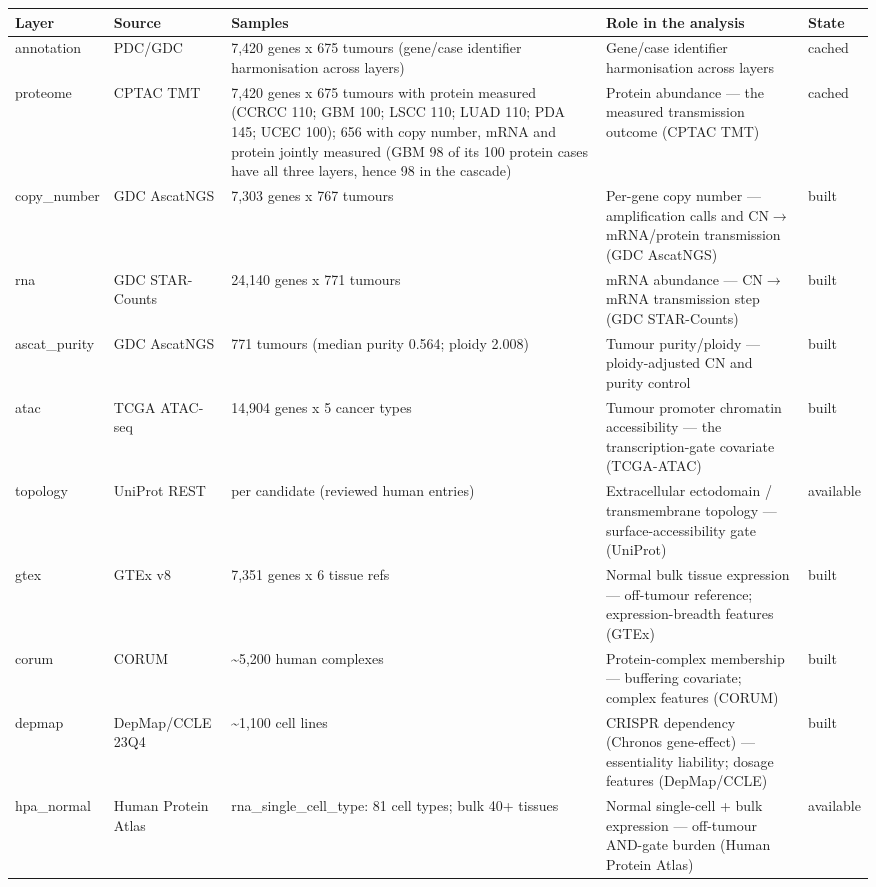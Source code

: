 \documentclass[times, twoside]{zHenriquesLab-StyleBioRxiv}
\begin{document}
\begin{table}[tbp]
\centering
{\scriptsize
\begin{tabular}{@{}p{}p{}p{}p{}p{}@{}}
\toprule
\textbf{Layer} & \textbf{Source} & \textbf{Samples} & \textbf{Role in the analysis} & \textbf{State} \\
\midrule
annotation & PDC/GDC & 7,420 genes x 675 tumours (gene/case identifier harmonisation across layers) & Gene/case identifier harmonisation across layers & cached \\
proteome & CPTAC TMT & 7,420 genes x 675 tumours with protein measured (CCRCC 110; GBM 100; LSCC 110; LUAD 110; PDA 145; UCEC 100); 656 with copy number, mRNA and protein jointly measured (GBM 98 of its 100 protein cases have all three layers, hence 98 in the cascade) & Protein abundance --- the measured transmission outcome (CPTAC TMT) & cached \\
copy\_number & GDC AscatNGS & 7,303 genes x 767 tumours & Per-gene copy number --- amplification calls and CN$\rightarrow$mRNA/protein transmission (GDC AscatNGS) & built \\
rna & GDC STAR-Counts & 24,140 genes x 771 tumours & mRNA abundance --- CN$\rightarrow$mRNA transmission step (GDC STAR-Counts) & built \\
ascat\_purity & GDC AscatNGS & 771 tumours (median purity 0.564; ploidy 2.008) & Tumour purity/ploidy --- ploidy-adjusted CN and purity control & built \\
atac & TCGA ATAC-seq & 14,904 genes x 5 cancer types & Tumour promoter chromatin accessibility --- the transcription-gate covariate (TCGA-ATAC) & built \\
topology & UniProt REST & per candidate (reviewed human entries) & Extracellular ectodomain / transmembrane topology --- surface-accessibility gate (UniProt) & available \\
gtex & GTEx v8 & 7,351 genes x 6 tissue refs & Normal bulk tissue expression --- off-tumour reference; expression-breadth features (GTEx) & built \\
corum & CORUM & \textasciitilde{}5,200 human complexes & Protein-complex membership --- buffering covariate; complex features (CORUM) & built \\
depmap & DepMap/CCLE 23Q4 & \textasciitilde{}1,100 cell lines & CRISPR dependency (Chronos gene-effect) --- essentiality liability; dosage features (DepMap/CCLE) & built \\
hpa\_normal & Human Protein Atlas & rna\_single\_cell\_type: 81 cell types; bulk 40+ tissues & Normal single-cell + bulk expression --- off-tumour AND-gate burden (Human Protein Atlas) & available \\

\end{tabular}}
\end{table}
\end{document}
